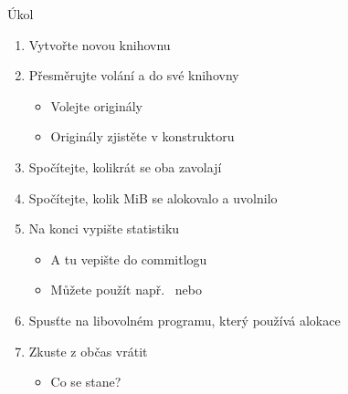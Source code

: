 \begin{frame}{Úkol}

  \begin{enumerate}
    \item Vytvořte novou knihovnu

    \item Přesměrujte volání  a  do své knihovny
    \begin{itemize}
      \item Volejte originály
      \item Originály zjistěte v konstruktoru
    \end{itemize}

    \item Spočítejte, kolikrát se oba zavolají
    \item Spočítejte, kolik MiB se alokovalo a uvolnilo

    \item Na konci vypište statistiku
    \begin{itemize}
      \item A tu vepište do commitlogu
      \item Můžete použít např.\  nebo 
    \end{itemize}

    \item Spusťte na libovolném programu, který používá alokace
    \item Zkuste z  občas vrátit 
    \begin{itemize}
      \item Co se stane?
    \end{itemize}
  \end{enumerate}

\end{frame}


